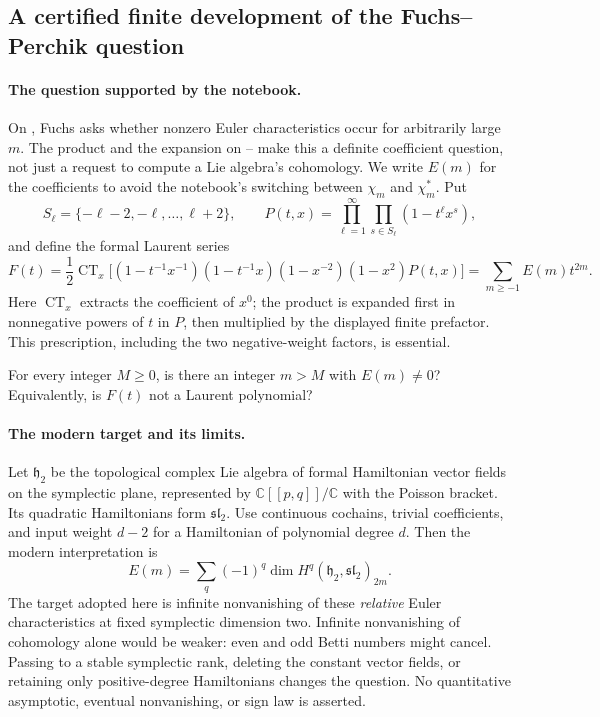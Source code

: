 \subsection{A certified finite development of the Fuchs--Perchik question}
\label{dev:perchik}

\paragraph{The question supported by the notebook.}
On , Fuchs asks whether nonzero Euler characteristics occur
for arbitrarily large \(m\). The product and the expansion on
-- make this a definite coefficient question,
not just a request to compute a Lie algebra's cohomology. We write \(E(m)\)
for the coefficients to avoid the notebook's switching between
\(\chi_m\) and \(\chi_m^*\). Put
\[
 S_\ell=\{-\ell-2,-\ell,\ldots,\ell+2\},\qquad
 P(t,x)=\prod_{\ell=1}^{\infty}\prod_{s\in S_\ell}(1-t^\ell x^s),
\]
and define the formal Laurent series
\begin{equation}\label{eq:perchikseries}
 F(t)=\frac12\operatorname{CT}_x
 \bigl[(1-t^{-1}x^{-1})(1-t^{-1}x)
       (1-x^{-2})(1-x^2)P(t,x)\bigr]
 =\sum_{m\geq-1}E(m)t^{2m}.
\end{equation}
Here \(\operatorname{CT}_x\) extracts the coefficient of \(x^0\);
the product is expanded first in nonnegative powers of \(t\) in \(P\),
then multiplied by the displayed finite prefactor. This prescription,
including the two negative-weight factors, is essential.

\begin{question}
For every integer \(M\geq0\), is there an integer \(m>M\) with
\(E(m)\ne0\)? Equivalently, is \(F(t)\) not a Laurent polynomial?
\end{question}

\paragraph{The modern target and its limits.}
Let \(\mathfrak h_2\) be the topological complex Lie algebra of formal
Hamiltonian vector fields on the symplectic plane, represented by
\(\mathbb C[[p,q]]/\mathbb C\) with the Poisson bracket. Its quadratic
Hamiltonians form \(\mathfrak{sl}_2\). Use continuous cochains, trivial
coefficients, and input weight \(d-2\) for a Hamiltonian of polynomial
degree \(d\). Then the modern interpretation is
\[
 E(m)=\sum_q(-1)^q
 \dim H^q(\mathfrak h_2,\mathfrak{sl}_2)_{2m}.
\]
The target adopted here is infinite nonvanishing of these \emph{relative}
Euler characteristics at fixed symplectic dimension two. Infinite
nonvanishing of cohomology alone would be weaker: even and odd Betti
numbers might cancel. Passing to a stable symplectic rank, deleting the
constant vector fields, or retaining only positive-degree Hamiltonians
changes the question. No quantitative asymptotic, eventual nonvanishing,
or sign law is asserted.

